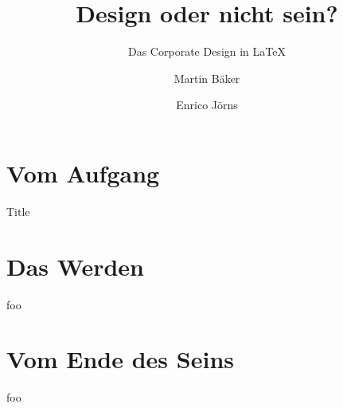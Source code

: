 \documentclass{beamer}
\begin{document}
\title{Design oder nicht sein?}
\subtitle{Das Corporate Design in  LaTeX}
\author{Martin Bäker\and Enrico Jörns}
\titlegraphic{\tuDefaultTitlegraphic}

\begin{frame}[plain]
  \titlepage
\end{frame}


\part{Vom Aufgang}

\begin{frame}[plain]
  \partpage
\end{frame}

\begin{frame}{Title}
  \lipsum[2]
\end{frame}

\part{Das Werden}

\begin{frame}
  \partpage
\end{frame}


\begin{frame}
  foo
\end{frame}

\part{Vom Ende des Seins}



\begin{frame}
  foo
\end{frame}



\begin{frame}[plain]
  \partpage
\end{frame}
\end{document}
